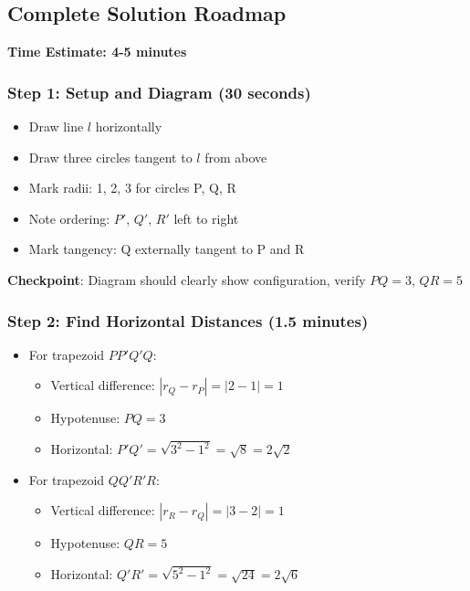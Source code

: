 \documentclass[]{article}
\begin{document}
\begin{solutionbox}
\subsection*{Complete Solution Roadmap}

\textbf{Time Estimate: 4-5 minutes}

\subsubsection*{Step 1: Setup and Diagram (30 seconds)}
\begin{itemize}[leftmargin=*]
    \item Draw line $l$ horizontally
    \item Draw three circles tangent to $l$ from above
    \item Mark radii: 1, 2, 3 for circles P, Q, R
    \item Note ordering: $P'$, $Q'$, $R'$ left to right
    \item Mark tangency: Q externally tangent to P and R
\end{itemize}

\textbf{Checkpoint}: Diagram should clearly show configuration, verify $PQ = 3$, $QR = 5$

\subsubsection*{Step 2: Find Horizontal Distances (1.5 minutes)}
\begin{itemize}[leftmargin=*]
    \item For trapezoid $PP'Q'Q$:
    \begin{itemize}
        \item Vertical difference: $|r_Q - r_P| = |2-1| = 1$
        \item Hypotenuse: $PQ = 3$
        \item Horizontal: $P'Q' = \sqrt{3^2 - 1^2} = \sqrt{8} = 2\sqrt{2}$
    \end{itemize}
    
    \item For trapezoid $QQ'R'R$:
    \begin{itemize}
        \item Vertical difference: $|r_R - r_Q| = |3-2| = 1$
        \item Hypotenuse: $QR = 5$
        \item Horizontal: $Q'R' = \sqrt{5^2 - 1^2} = \sqrt{24} = 2\sqrt{6}$
    \end{itemize}
\end{itemize}


\end{solutionbox}
\end{document}
